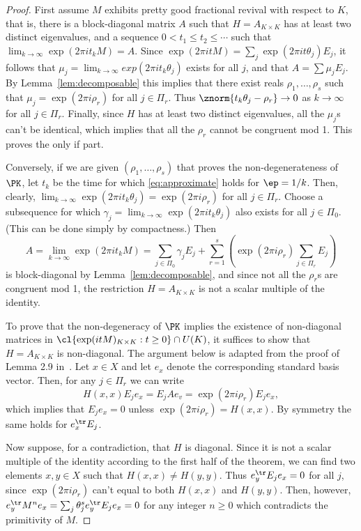 \begin{proof}
First assume $M$ exhibits pretty good fractional revival with respect to $K$, that is, there is a block-diagonal matrix $A$ such that $H  = A_{K\times K}$ has at least two distinct eigenvalues, and a sequence $0 < t_1 \leq t_2 \leq \cdots$ such that $\lim_{k\to \infty} \exp(2\pi i t_k M) = A$. Since $\exp(2\pi i t M) = \sum_j \exp(2\pi i t \theta_j) E_j$, it follows that $\mu_j = \lim_{k\to \infty} exp(2\pi i t_k \theta_j)$ exists for all $j$, and that $A = \sum \mu_j E_j$. By Lemma~\ref{lem:decomposable} this implies that there exist reals $\rho_1, \dots, \rho_s$ such that $\mu_j = \exp(2\pi i \rho_r)$ for all $j \in \Pi_r$. Thus $\znorm{t_k \theta_j - \rho_r} \to 0$ as $k\to \infty$ for all $j \in \Pi_r$. Finally, since $H$ has at least two distinct eigenvalues, all the $\mu_j$s can't be identical, which implies that all the $\rho_r$ cannot be congruent mod 1. This proves the only if part.

Conversely, if we are given $(\rho_1,\dots, \rho_s)$ that proves the non-degenerateness of $\PK$, let $t_k$ be the time for which \eqref{eq:approximate} holds for $\ep = 1/k$. Then, clearly, $\lim_{k\to \infty} \exp(2\pi i t_k \theta_j) = \exp(2\pi i \rho_r)$ for all $j \in \Pi_r$. Choose a subsequence for which $\gamma_j = \lim_{k \to \infty} \exp(2\pi i t_k \theta_j)$ also exists for all $j \in \Pi_0$. (This can be done simply by compactness.) Then 
\begin{equation}\label{eq:closure} 
A =  \lim_{k\to \infty} \exp(2\pi i t_k M) = \sum_{j \in \Pi_0} \gamma_j E_j + \sum_{r=1}^s \left(\exp(2\pi i \rho_r) \sum_{j \in \Pi_r} E_j\right)
\end{equation} 
is block-diagonal by Lemma~\ref{lem:decomposable}, and since not all the $\rho_r$s are congruent mod 1, the restriction $H = A_{K\times K}$ is not a scalar multiple of the identity.

To prove that the non-degeneracy of $\PK$ implies the existence of non-diagonal matrices in $\cl \{ \exp(i t M)_{K \times K} : t \geq 0\} \cap U(K)$, it suffices to show that $H = A_{K\times K}$ is non-diagonal. The argument below is adapted from the proof of Lemma 2.9 in~\cite{chan2020fundamentals}. Let $x \in X$ and let $e_x$ denote the corresponding standard basis vector. Then, for any $j \in \Pi_r$ we can write
\[ H(x,x) E_j e_x = E_j A e_v = \exp(2\pi i \rho_r) E_j e_x,\] which implies that $E_j e_x = 0$ unless $\exp(2\pi i \rho_r) = H(x,x)$. By symmetry the same holds for $e_x^{\tr} E_j$.  

Now suppose, for a contradiction, that $H$ is diagonal. Since it is not a scalar multiple of the identity according to the first half of the theorem, we can find two elements $x,y \in X$ such that $H(x,x) \neq H(y,y)$. Thus $e_y^{\tr} E_j e_x = 0$ for all $j$, since $\exp(2\pi i \rho_r)$ can't equal to both $H(x,x)$ and $H(y,y)$. Then, however, $e_y^{\tr} M^n e_x = \sum_j \theta_j^s e_y^{\tr} E_j e_x = 0$ for any integer $n\geq 0$ which contradicts the primitivity of $M$. 
\end{proof}


